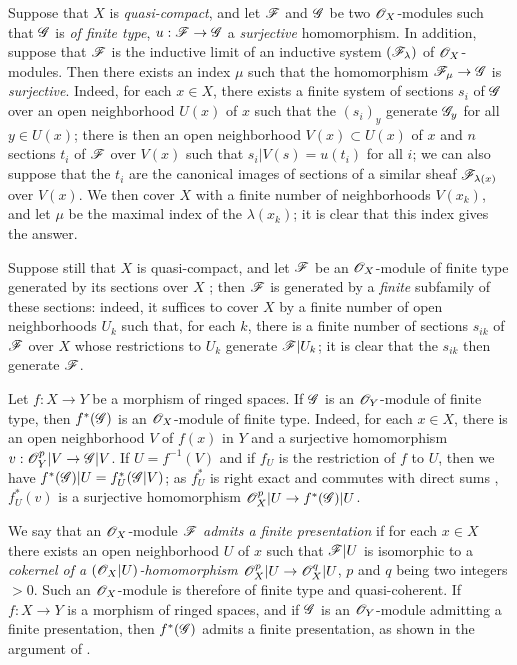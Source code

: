 \begin{env}[5.2.3]
\label{0.5.2.3}
Suppose that $X$ is \emph{quasi-compact}, and let $\mathscr{F}$ and $\mathscr{G}$ be two $\mathscr{O}_X$-modules such that $\mathscr{G}$ is \emph{of finite type}, $u:\sh{F}\to\sh{G}$ a \emph{surjective} homomorphism.
In addition, suppose that $\mathscr{F}$ is the inductive limit of an inductive system $(\mathscr{F}_\lambda)$ of $\mathscr{O}_X$-modules.
Then there exists an index $\mu$ such that the homomorphism $\sh{F}_\mu\to\sh{G}$ is \emph{surjective}.
Indeed, for each $x\in X$, there exists a finite system of sections $s_i$ of $\mathscr{G}$ over an open neighborhood $U(x)$ of $x$ such that the $(s_i)_y$ generate $\mathscr{G}_y$ for all $y\in U(x)$;
there is then an open neighborhood $V(x)\subset U(x)$ of $x$ and $n$ sections $t_i$ of $\mathscr{F}$ over $V(x)$ such that $s_i|V(s)=u(t_i)$ for all $i$;
we can also suppose that the $t_i$ are the canonical images of sections of a similar sheaf $\mathscr{F}_{\lambda(x)}$ over $V(x)$.
We then cover $X$ with a finite number of neighborhoods $V(x_k)$, and let $\mu$ be the maximal index of the $\lambda(x_k)$;
it is clear that this index gives the answer.

Suppose still that $X$ is quasi-compact, and let $\mathscr{F}$ be an $\mathscr{O}_X$-module of finite type generated by its sections over $X$ ;
then $\mathscr{F}$ is generated by a \emph{finite} subfamily of these sections:
indeed, it suffices to cover $X$ by a finite number of open neighborhoods $U_k$ such that, for each $k$, there is a finite number of sections $s_{ik}$ of $\mathscr{F}$ over $X$ whose restrictions to $U_k$ generate $\mathscr{F}|U_k$;
it is clear that the $s_{ik}$ then generate $\mathscr{F}$.
\end{env}

\begin{env}[5.2.4]
\label{0.5.2.4}
Let $f:X\to Y$ be a morphism of ringed spaces.
If $\mathscr{G}$ is an $\mathscr{O}_Y$-module of finite type, then $f^*(\mathscr{G})$ is an $\mathscr{O}_X$-module of finite type.
Indeed, for each $x\in X$, there is an open neighborhood $V$ of $f(x)$ in $Y$ and a surjective homomorphism $v:\OO_Y^p|V\to\sh{G}|V$.
If $U=f^{-1}(V)$ and if $f_U$ is the restriction of $f$ to $U$, then we have $f^*(\mathscr{G})|U=f_U^*(\mathscr{G}|V)$;
as $f_U^*$ is right exact  and commutes with direct sums , $f_U^*(v)$ is a surjective homomorphism $\OO_X^p|U\to f^*(\sh{G})|U$.
\end{env}

\begin{env}[5.2.5]
\label{0.5.2.5}
We say that an $\mathscr{O}_X$-module $\mathscr{F}$ \emph{admits a finite presentation} if for each $x\in X$ there exists an open neighborhood $U$ of $x$ such that $\mathscr{F}|U$ is isomorphic to a \emph{cokernel of a $(\mathscr{O}_X|U)$-homomorphism $\OO_X^p|U\to\OO_X^q|U$}, $p$ and $q$ being two integers $>0$.
Such an $\mathscr{O}_X$-module is therefore of finite type and quasi-coherent.
If $f:X\to Y$ is a morphism of ringed spaces, and if $\mathscr{G}$ is an $\mathscr{O}_Y$-module admitting a finite presentation, then $f^*(\mathscr{G})$ admits a finite presentation, as shown in the argument of .
\end{env}

